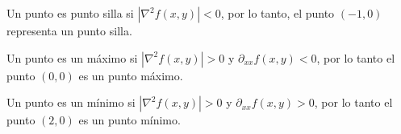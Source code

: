 Un punto es punto silla si $|\nabla^2 f(x,y)|<0$, por lo tanto, el punto $(-1,0)$ representa un punto silla.

Un punto es un máximo si $|\nabla^2 f(x,y)|>0$ y $\partial_{xx} f(x,y)<0$, por lo tanto el punto $(0,0)$ es un punto máximo.

Un punto es un mínimo si $|\nabla^2 f(x,y)|>0$ y $\partial_{xx} f(x,y)>0$, por lo tanto el punto $(2,0)$ es un punto mínimo.